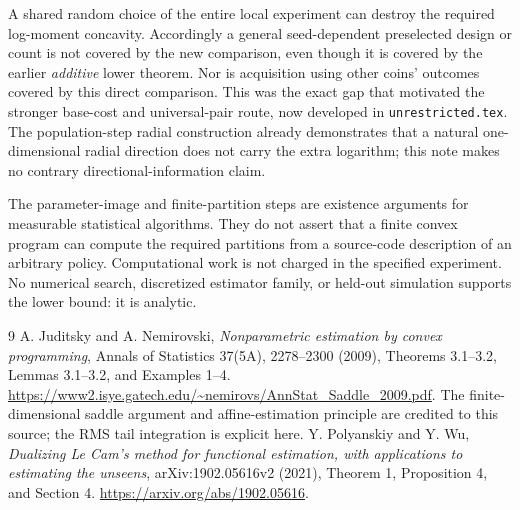 \documentclass[11pt]{article}
\begin{document}
A shared random choice of the entire local experiment can destroy the
required log-moment concavity. Accordingly a general seed-dependent
preselected design or count is not covered by the new comparison, even
though it is covered by the earlier \emph{additive} lower theorem.
Nor is acquisition using other coins' outcomes covered by this direct
comparison. This was the exact gap that motivated the stronger base-cost
and universal-pair route, now developed in \texttt{unrestricted.tex}. The
population-step radial construction already demonstrates that a natural
one-dimensional radial direction does not carry the extra logarithm;
this note makes no contrary directional-information claim.

The parameter-image and finite-partition steps are existence arguments
for measurable statistical algorithms. They do not assert that a finite
convex program can compute the required partitions from a source-code
description of an arbitrary policy. Computational work is not charged in
the specified experiment. No numerical search, discretized estimator
family, or held-out simulation supports the lower bound: it is analytic.

\begin{thebibliography}{9}
 A. Juditsky and A. Nemirovski,
\emph{Nonparametric estimation by convex programming},
Annals of Statistics 37(5A), 2278--2300 (2009),
Theorems 3.1--3.2, Lemmas 3.1--3.2, and Examples 1--4.
\url{https://www2.isye.gatech.edu/~nemirovs/AnnStat_Saddle_2009.pdf}.
The finite-dimensional saddle argument and affine-estimation principle
are credited to this source; the RMS tail integration is explicit here.
 Y. Polyanskiy and Y. Wu,
\emph{Dualizing Le Cam's method for functional estimation, with
applications to estimating the unseens}, arXiv:1902.05616v2 (2021),
Theorem 1, Proposition 4, and Section 4.
\url{https://arxiv.org/abs/1902.05616}.
\end{thebibliography}
\end{document}
